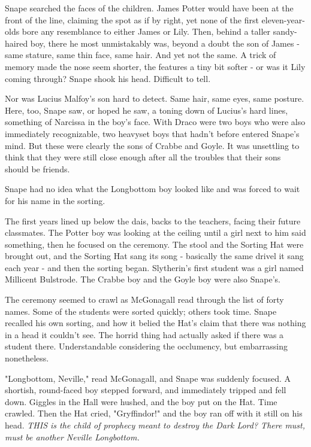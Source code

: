\documentclass[a4paper,11pt]{article}
\begin{document}
Snape searched the faces of the children. James Potter would have been at the front of the line, claiming the spot as if by right, yet none of the first eleven-year-olds bore any resemblance to either James or Lily. Then, behind a taller sandy-haired boy, there he most unmistakably was, beyond a doubt the son of James - same stature, same thin face, same hair. And yet not the same. A trick of memory made the nose seem shorter, the features a tiny bit softer - or was it Lily coming through? Snape shook his head. Difficult to tell.

Nor was Lucius Malfoy's son hard to detect. Same hair, same eyes, same posture. Here, too, Snape saw, or hoped he saw, a toning down of Lucius's hard lines, something of Narcissa in the boy's face. With Draco were two boys who were also immediately recognizable, two heavyset boys that hadn't before entered Snape's mind. But these were clearly the sons of Crabbe and Goyle. It was unsettling to think that they were still close enough after all the troubles that their sons should be friends.

Snape had no idea what the Longbottom boy looked like and was forced to wait for his name in the sorting.

The first years lined up below the dais, backs to the teachers, facing their future classmates. The Potter boy was looking at the ceiling until a girl next to him said something, then he focused on the ceremony. The stool and the Sorting Hat were brought out, and the Sorting Hat sang its song - basically the same drivel it sang each year - and then the sorting began. Slytherin's first student was a girl named Millicent Bulstrode. The Crabbe boy and the Goyle boy were also Snape's.

The ceremony seemed to crawl as McGonagall read through the list of forty names. Some of the students were sorted quickly; others took time. Snape recalled his own sorting, and how it belied the Hat's claim that there was nothing in a head it couldn't see. The horrid thing had actually asked if there was a student there. Understandable considering the occlumency, but embarrassing nonetheless.

"Longbottom, Neville," read McGonagall, and Snape was suddenly focused. A shortish, round-faced boy stepped forward, and immediately tripped and fell down. Giggles in the Hall were hushed, and the boy put on the Hat. Time crawled. Then the Hat cried, "Gryffindor!" and the boy ran off with it still on his head. \emph{THIS is the child of prophecy meant to destroy the Dark Lord? There must, must be another Neville Longbottom.}
\end{document}
